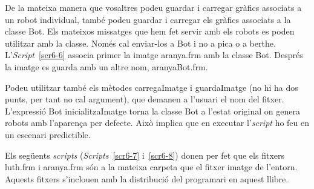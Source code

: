 De la mateixa manera que vosaltres podeu guardar i carregar gràfics associats a un robot individual, també podeu guardar  i carregar els gràfics associats a la classe \textsf{Bot}. Els mateixos missatges que hem fet servir amb els robots es poden utilitzar
amb la classe. Només cal enviar-los a \textsf{Bot} i no a \textsf{pica} o a \textsf{berthe}. L'\emph{Script}~\ref{scr6-6} associa primer la imatge \textsf{aranya.frm} amb la classe \textsf{Bot}. Després la imatge es guarda amb un altre nom, \textsf{aranyaBot.frm}. 

Podeu utilitzar també els mètodes \textsf{carregaImatge} i \textsf{guardaImatge}  (no hi ha dos punts, per tant no cal argument), que demanen a l'usuari el nom del fitxer. L'expressió \textsf{Bot inicialitzaImatge} torna la classe \textsf{Bot} a l'estat original on genera robots amb l'aparença per defecte. Això implica que en executar l'\emph{script} ho feu en un escenari predictible.       


Els següents \emph{scripts} (\emph{Scripts}~\ref{scr6-7} i~\ref{scr6-8}) donen per fet que els fitxers \textsf{luth.frm} i \textsf{aranya.frm} són a la mateixa carpeta que el fitxer imatge de l'entorn. Aquests fitxers s'inclouen amb la distribució del programari en aquest llibre.  

